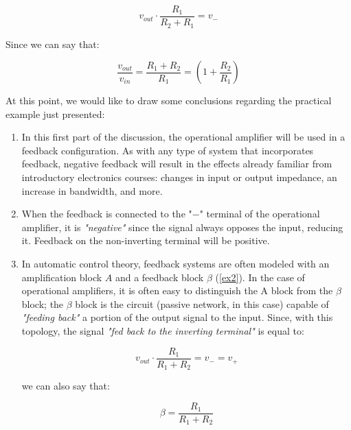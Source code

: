 \documentclass[../main.tex]{subfiles}
\begin{document}
\begin{equation}
	v_{out} \cdot \frac{R_1}{R_2 + R_1} = v_-
\end{equation}

Since we can say that:

\begin{equation}
	\frac{v_{out}}{v_{in}} = \frac{R_1 + R_2}{R_1} = \left( 1 + \frac{R_2}{R_1} \right)
\end{equation}

At this point, we would like to draw some conclusions regarding the practical example just presented:

\begin{enumerate}[label=\textbf{-}]
	\item In this first part of the discussion, the operational amplifier will be used in a feedback configuration. As with any type of system that incorporates feedback, negative feedback will result in the effects already familiar from introductory electronics courses: changes in input or output impedance, an increase in bandwidth, and more.
	\item When the feedback is connected to the "$-$" terminal of the operational amplifier, it is \textit{"negative"} since the signal always opposes the input, reducing it. Feedback on the non-inverting terminal will be positive.
	\item In automatic control theory, feedback systems are often modeled with an amplification block $A$ and a feedback block $\beta$ (\autoref{ex2}). In the case of operational amplifiers, it is often easy to distinguish the A block from the $\beta$ block; the $\beta$ block is the circuit (passive network, in this case) capable of \textit{"feeding back"} a portion of the output signal to the input. Since, with this topology, the signal \textit{"fed back to the inverting terminal"} is equal to:
	
	\begin{equation}
		v_{out} \cdot \frac{R_1}{R_1 + R_2} = v_- = v_+
	\end{equation}
	
	we can also say that:
	
	\begin{equation}
		\beta = \frac{R_1}{R_1 + R_2}
	\end{equation}
	
	
	\begin{figure}[h]
	\begin{center}
	

\end{center}
\end{figure}
\end{enumerate}
\end{document}
